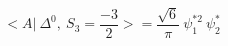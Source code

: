 \begin{equation}
<A|~\Delta^{0},~ S_3=\frac{-3}{2} >= \frac{\sqrt{6}}{\pi} ~\psi_1^{*2}~ \psi_2^*
\end{equation}

